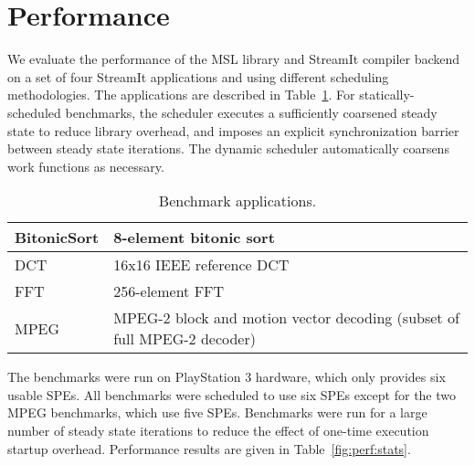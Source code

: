 \section{Performance}\label{ch:perf}

We evaluate the performance of the MSL library and StreamIt compiler backend
on a set of four StreamIt applications and using different scheduling
methodologies. The applications are described in Table~\ref{fig:perf:apps}.
For statically-scheduled benchmarks, the scheduler executes a sufficiently
coarsened steady state to reduce library overhead, and imposes an explicit
synchronization barrier between steady state iterations. The dynamic scheduler
automatically coarsens work functions as necessary.

\begin{table}[!htb]
\begin{center}
\begin{tabular}{|l|p{2.25in}|}
\hline
BitonicSort & 8-element bitonic sort \\
\hline
DCT         & 16x16 IEEE reference DCT \\
\hline
FFT         & 256-element FFT \\
\hline
MPEG        & MPEG-2 block and motion vector decoding (subset of full MPEG-2 decoder) \\
\hline
\end{tabular}
\end{center}
\caption{Benchmark applications.}
\label{fig:perf:apps}
\end{table}

The benchmarks were run on PlayStation 3 hardware, which only provides
six usable SPEs. All benchmarks were scheduled to use six SPEs except
for the two MPEG benchmarks, which use five SPEs.
Benchmarks were run for a large number of steady state iterations
to reduce the effect of one-time execution startup overhead.
Performance results are given in Table~\ref{fig:perf:stats}.

